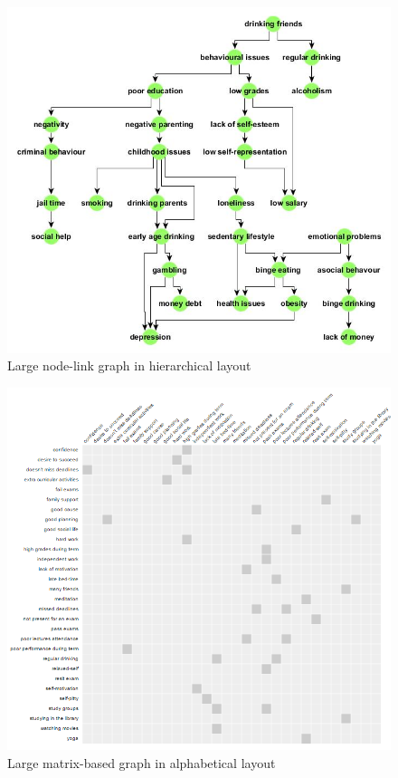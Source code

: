 \documentclass{l4proj}
\begin{document}
\begin{appendices}
\begin{figure}[H]
\centering
\includegraphics[width=15cm]{drinkingIssuesLargeHier.jpg}
\caption{Large node-link graph in hierarchical layout}
\label{nodeLinkGraph}
\end{figure}



\begin{figure}[H]
\centering
\includegraphics[width=15cm]{studentLargeAlpha.PNG}
\caption{Large matrix-based graph in alphabetical layout}
\label{matrixBasedGraph}
\end{figure}



\end{appendices}
\end{document}
